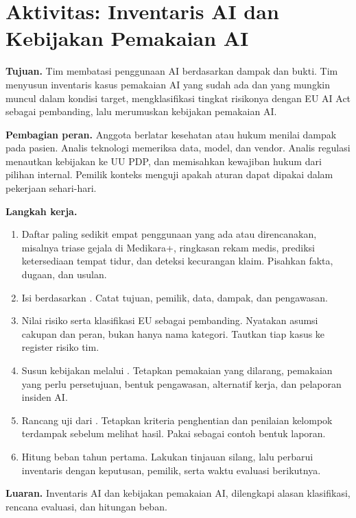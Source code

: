 \section{Aktivitas: Inventaris AI dan Kebijakan Pemakaian AI}

\textbf{Tujuan.} Tim membatasi penggunaan AI berdasarkan dampak dan bukti. Tim menyusun inventaris
kasus pemakaian AI yang sudah ada dan yang mungkin muncul dalam kondisi target, mengklasifikasi
tingkat risikonya dengan EU AI Act sebagai pembanding, lalu merumuskan kebijakan pemakaian AI.

\textbf{Pembagian peran.} Anggota berlatar kesehatan atau hukum menilai dampak pada pasien. Analis
teknologi memeriksa data, model, dan vendor. Analis regulasi menautkan kebijakan ke UU PDP, dan
memisahkan kewajiban hukum dari pilihan internal. Pemilik konteks menguji apakah aturan dapat
dipakai dalam pekerjaan sehari-hari.

\textbf{Langkah kerja.}
\begin{enumerate}
  \item Daftar paling sedikit empat penggunaan yang ada atau direncanakan, misalnya triase gejala di
  Medikara+, ringkasan rekam medis, prediksi ketersediaan tempat tidur, dan deteksi kecurangan
  klaim. Pisahkan fakta, dugaan, dan usulan.
  \item Isi  berdasarkan
  . Catat tujuan, pemilik, data, dampak, dan
  pengawasan.
  \item Nilai risiko serta klasifikasi EU sebagai pembanding. Nyatakan asumsi cakupan dan peran,
  bukan hanya nama kategori. Tautkan tiap kasus ke register risiko tim.
  \item Susun kebijakan melalui . Tetapkan
  pemakaian yang dilarang, pemakaian yang perlu persetujuan, bentuk pengawasan, alternatif kerja,
  dan pelaporan insiden AI.
  \item Rancang uji dari . Tetapkan kriteria
  penghentian dan penilaian kelompok terdampak sebelum melihat hasil. Pakai
   sebagai contoh bentuk laporan.
  \item Hitung beban tahun pertama. Lakukan tinjauan silang, lalu perbarui inventaris dengan
  keputusan, pemilik, serta waktu evaluasi berikutnya.
\end{enumerate}

\textbf{Luaran.} Inventaris AI dan kebijakan pemakaian AI, dilengkapi alasan klasifikasi, rencana
evaluasi, dan hitungan beban.

